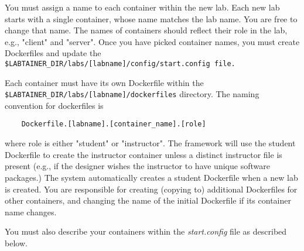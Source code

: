 \documentclass{article}
\begin{document}
You must assign a name to each container within the new lab.  Each new lab
starts with a single container, whose name matches the lab name.  You are free
to change that name. The names of containers should reflect their role in the lab,
e.g., "client" and "server".  Once you have picked container names, you must create
Dockerfiles and update the \verb!$LABTAINER_DIR/labs/[labname]/config/start.config file.!

Each container must have its own Dockerfile within the \verb!$LABTAINER_DIR/labs/[labname]/dockerfiles!
directory.  The naming convention for dockerfiles is
\begin{verbatim}
    Dockerfile.[labname].[container_name].[role]
\end{verbatim}
where role is either "student" or "instructor".  The framework will use the student Dockerfile to
create the instructor container unless a distinct instructor file is present (e.g., if the designer
wishes the instructor to have unique software packages.) The system automatically creates a student Dockerfile
when a new lab is created.  You are responsible for creating (copying to) additional Dockerfiles for other containers,
and changing the name of the initial Dockerfile if its container name changes.

You must also describe your containers within the \textit{start.config} file as described below.
\end{document}
